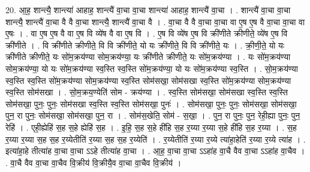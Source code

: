 \documentclass[17pt]{extarticle}
\begin{document}
20. आ॒ह॒ शान्त्यै॒ शान्त्या॑ आहाह॒ शान्त्यै॑ वा॒चा वा॒चा शान्त्या॑ आहाह॒ शान्त्यै॑ वा॒चा । . शान्त्यै॑ वा॒चा वा॒चा शान्त्यै॒ शान्त्यै॑ वा॒चा वै वै वा॒चा शान्त्यै॒ शान्त्यै॑ वा॒चा वै । . वा॒चा वै वै वा॒चा वा॒चा वा ए॒ष ए॒ष वै वा॒चा वा॒चा वा ए॒षः । . वा ए॒ष ए॒ष वै वा ए॒ष वि व्ये॑ष वै वा ए॒ष वि । . ए॒ष वि व्ये॑ष ए॒ष वि क्री॑णीते क्रीणीते॒ व्ये॑ष ए॒ष वि क्री॑णीते । . वि क्री॑णीते क्रीणीते॒ वि वि क्री॑णीते॒ यो यः क्री॑णीते॒ वि वि क्री॑णीते॒ यः । . क्री॒णी॒ते॒ यो यः क्री॑णीते क्रीणीते॒ यः सो॑म॒क्रय॑ण्या सोम॒क्रय॑ण्या॒ यः क्री॑णीते क्रीणीते॒ यः सो॑म॒क्रय॑ण्या । . यः सो॑म॒क्रय॑ण्या सोम॒क्रय॑ण्या॒ यो यः सो॑म॒क्रय॑ण्या स्व॒स्ति स्व॒स्ति सो॑म॒क्रय॑ण्या॒ यो यः सो॑म॒क्रय॑ण्या स्व॒स्ति । . सो॒म॒क्रय॑ण्या स्व॒स्ति स्व॒स्ति सो॑म॒क्रय॑ण्या सोम॒क्रय॑ण्या स्व॒स्ति सोम॑सखा॒ सोम॑सखा स्व॒स्ति सो॑म॒क्रय॑ण्या सोम॒क्रय॑ण्या स्व॒स्ति सोम॑सखा । . सो॒म॒क्रय॒ण्येति॑ सोम - क्रय॑ण्या । . स्व॒स्ति सोम॑सखा॒ सोम॑सखा स्व॒स्ति स्व॒स्ति सोम॑सखा॒ पुनः॒ पुनः॒ सोम॑सखा स्व॒स्ति स्व॒स्ति सोम॑सखा॒ पुनः॑ । . सोम॑सखा॒ पुनः॒ पुनः॒ सोम॑सखा॒ सोम॑सखा॒ पुन॒ रा पुनः॒ सोम॑सखा॒ सोम॑सखा॒ पुन॒ रा । . सोम॑स॒खेति॒ सोम॑ - स॒खा॒ । . पुन॒ रा पुनः॒ पुन॒ रेही॒ह्या पुनः॒ पुन॒ रेहि॑ । . एही॒ह्येहि॑ स॒ह स॒हे ह्येहि॑ स॒ह । . इ॒हि॒ स॒ह स॒हे ही॑हि स॒ह र॒य्या र॒य्या स॒हे ही॑हि स॒ह र॒य्या । . स॒ह र॒य्या र॒य्या स॒ह स॒ह र॒य्येतीति॑ र॒य्या स॒ह स॒ह र॒य्येति॑ । . र॒य्येतीति॑ र॒य्या र॒य्ये त्या॑हा॒हेति॑ र॒य्या र॒य्ये त्या॑ह । . इत्या॑हा॒हे तीत्या॑ह वा॒चा वा॒चा ऽऽहे तीत्या॑ह वा॒चा । . आ॒ह॒ वा॒चा वा॒चा ऽऽहा॑ह वा॒चै वैव वा॒चा ऽऽहा॑ह वा॒चैव । . वा॒चै वैव वा॒चा वा॒चैव वि॒क्रीय॑ वि॒क्रीयै॒व वा॒चा वा॒चैव वि॒क्रीय॑ । \newline
\end{document}
